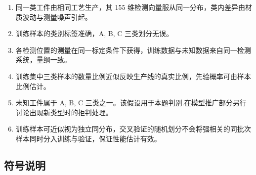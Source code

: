 \documentclass[12pt,a4paper]{article}
\begin{document}
\begin{enumerate}[label=(\arabic*),leftmargin=2.4em]
\item 同一类工件由相同工艺生产，其 155 维检测向量服从同一分布，类内差异由材质波动与测量噪声引起。
\item 训练样本的类别标签准确，A, B, C 三类划分无误。
\item 各检测位置的测量在同一标定条件下获得，训练数据与未知数据来自同一检测系统，量纲一致。
\item 训练集中三类样本的数量比例近似反映生产线的真实比例，先验概率可由样本比例估计。
\item 未知工件属于 A, B, C 三类之一。该假设用于本题判别.在模型推广部分另行讨论出现新类型时的拒判处理。
\item 训练样本可近似视为独立同分布，交叉验证的随机划分不会将强相关的同批次样本同时分入训练与验证，保证性能估计有效。
\end{enumerate}

\subsection{符号说明}
\end{document}
